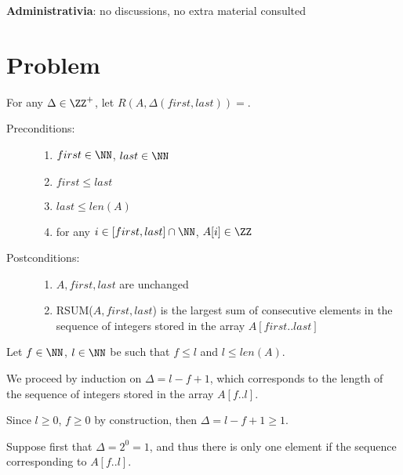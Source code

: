 \documentclass[11pt]{scrartcl}
\begin{document}
\textbf{Administrativia}: no discussions, no extra material consulted

\section{Problem}

For any $\Delta \in \ZZ^{+}$, let $R(A,
\Delta(first, last))=$.

\begin{description}

\item[Preconditions:] \hfill

  \begin{enumerate}
    
  \item $first\in\NN$, $last \in\NN$
  \item $first \leq last$
  \item $last \leq len(A)$
  \item for any $i\in[first, last]\cap\NN$, $A[i]\in\ZZ$
  \end{enumerate}

  
\item[Postconditions:]  \hfill

  
  \begin{enumerate}
  \item $A, first, last$ are unchanged
  \item RSUM($A, first, last$) is the largest sum of consecutive
    elements in the sequence of integers stored in the array
    $A[first..last]$
  \end{enumerate}

\end{description}

Let $f\in\NN$, $l\in\NN$ be such that $f \leq l$ and $l\leq len(A)$.

We proceed by induction on $\Delta = l - f+1$, which corresponds to
the length of the sequence of integers stored in the array $A[f..l]$.

Since $l\geq 0$, $f\geq 0$ by construction, then $\Delta = l-f+1\geq 1$.

Suppose first that $\Delta = 2^0 = 1$, and thus there is only one element if the sequence corresponding to $A[f..l]$.
\end{document}
